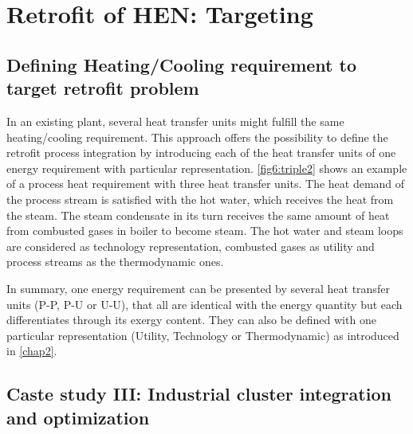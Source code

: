\section{Retrofit of HEN: Targeting}

\subsection{Defining Heating/Cooling requirement to target retrofit problem}
\label{subsec6:heattransinterface}
In an existing plant, several heat transfer units might fulfill the same heating/cooling requirement. This approach offers the possibility to define the retrofit process integration by introducing each of the heat transfer units of one energy requirement with particular representation. \cref{fig6:triple2} shows an example of a process heat requirement with three heat transfer units. The heat demand of the process stream is satisfied with the hot water, which receives the heat from the steam. The steam condensate in its turn receives the same amount of heat from combusted gases in boiler to become steam. The hot water and steam loops are considered as technology representation, combusted gases as utility and process streams as the thermodynamic ones. 

In summary, one energy requirement can be presented by several heat transfer units (P-P, P-U or U-U), that all are identical with the energy quantity but each differentiates through its exergy content. They can also be defined with one particular representation (Utility, Technology or Thermodynamic) as introduced in \cref{chap2}.


\subsection{Caste study III: Industrial cluster integration and optimization}